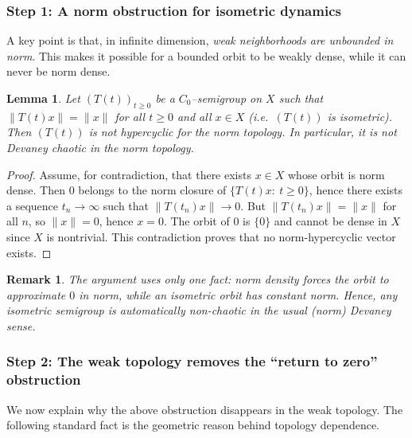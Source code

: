 \documentclass[12pt]{article}
\newtheorem{lemma}[theorem]{Lemma}
\newtheorem{remark}[theorem]{Remark}
\begin{document}
\subsubsection*{Step 1: A norm obstruction for isometric dynamics}

A key point is that, in infinite dimension, \emph{weak neighborhoods are unbounded in norm}. This makes it possible for a bounded orbit to be weakly dense, while it can never be norm dense.

\begin{lemma}
\label{lem:isometry_not_norm_hypercyclic}
Let $(T(t))_{t\ge 0}$ be a $C_0$--semigroup on $X$ such that $\|T(t)x\|=\|x\|$ for all $t\ge 0$ and all $x\in X$
(i.e.\ $(T(t))$ is isometric).
Then $(T(t))$ is \emph{not} hypercyclic for the norm topology. In particular, it is not Devaney chaotic in the norm topology.
\end{lemma}

\begin{proof}
Assume, for contradiction, that there exists $x\in X$ whose orbit is norm dense. Then $0$ belongs to the norm closure of
$\{T(t)x:\ t\ge 0\}$, hence there exists a sequence $t_n\to\infty$ such that $\|T(t_n)x\|\to 0$. But $\|T(t_n)x\|=\|x\|$ for all $n$, so $\|x\|=0$, hence $x=0$. The orbit of $0$ is $\{0\}$ and cannot be dense in $X$ since $X$ is nontrivial. This contradiction proves that no norm-hypercyclic vector exists.
\end{proof}

\begin{remark}
The argument uses only one fact: norm density forces the orbit to approximate $0$ in norm, while an isometric orbit has constant norm.
Hence, \emph{any} isometric semigroup is automatically non-chaotic in the usual (norm) Devaney sense.
\end{remark}

\subsubsection*{Step 2: The weak topology removes the ``return to zero'' obstruction}

We now explain why the above obstruction disappears in the weak topology. The following standard fact is the geometric reason behind topology dependence.
\end{document}
